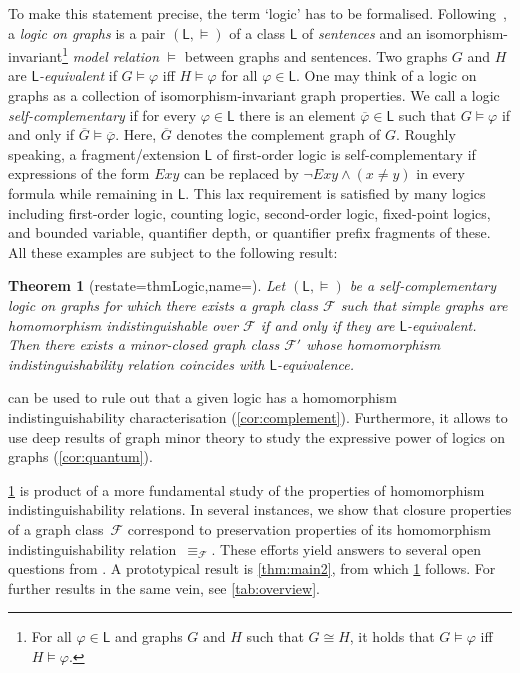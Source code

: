 \documentclass[3p,final]{elsarticle}
\renewcommand\phi\varphi
\newtheorem{theorem}{Theorem}
\begin{document}
	To make this statement precise, the term `logic' has to be formalised.	
	Following~\cite{barwise_extended_2017}, a \emph{logic on graphs} is a pair $(\mathsf{L}, \models)$ of a class $\mathsf{L}$ of \emph{sentences} and an isomorphism-invariant\footnote{For all $\phi \in \mathsf{L}$ and graphs $G$ and $H$ such that $G \cong H$, it holds that $G \models \phi$ iff $H \models \phi$.} \emph{model relation} $\models$ between graphs and sentences. 
	Two graphs $G$ and $H$ are \emph{$\mathsf{L}$-equivalent} if $G \models \phi$ iff $ H \models \phi$ for all $\phi \in \mathsf{L}$.
	One may think of a logic on graphs as a collection of isomorphism-invariant graph properties.
	We call a logic \emph{self-complementary} if for every $\phi \in \mathsf{L}$ there is an element $\overline{\phi} \in \mathsf{L}$ such that $G \models \phi$ if and only if $\overline{G} \models \overline{\phi}$.
	Here, $\overline{G}$ denotes the complement graph of $G$.
	Roughly speaking, a fragment/extension $\mathsf{L}$ of first-order logic is self-complementary if expressions of the form $Exy$ can be replaced by $\neg Exy \land (x \neq y)$ in every formula while remaining in $\mathsf{L}$.
	This lax requirement is satisfied by many logics including first-order logic, counting logic, second-order logic, fixed-point logics, and bounded variable, quantifier depth, or quantifier prefix fragments of these.
	All these examples are subject to the following result:
	
	\begin{theorem}[restate=thmLogic,name=]
		\label{thm:main1}
		Let $(\mathsf{L}, \models)$ be a self-complementary logic on graphs for which there exists a graph class
		$\mathcal{F}$ such that simple graphs are homomorphism indistinguishable over $\mathcal{F}$ if and only if they are $\mathsf{L}$-equivalent.
		Then there exists a minor-closed graph class $\mathcal{F}'$ whose homomorphism indistinguishability relation coincides with $\mathsf{L}$-equivalence.
	\end{theorem}

	 can be used to rule out that a given logic has a homomorphism indistinguishability characterisation (\cref{cor:complement}).
	Furthermore, it allows to use deep results of graph minor theory to study the expressive power of logics on graphs (\cref{cor:quantum}).
	
	\cref{thm:main1} is product of a more fundamental study of the properties of homomorphism indistinguishability relations. 
	In several instances, we show that closure properties of a graph class~$\mathcal{F}$ correspond to preservation properties of its homomorphism indistinguishability relation~$\equiv_{\mathcal{F}}$.
	These efforts yield answers to several open questions from \cite{roberson_oddomorphisms_2022}.
	A prototypical result is \cref{thm:main2}, from which \cref{thm:main1} follows. 
	For further results in the same vein, %
	see \cref{tab:overview}.
	
\end{document}
